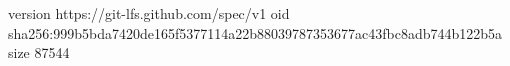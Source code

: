 version https://git-lfs.github.com/spec/v1
oid sha256:999b5bda7420de165f5377114a22b88039787353677ac43fbc8adb744b122b5a
size 87544
